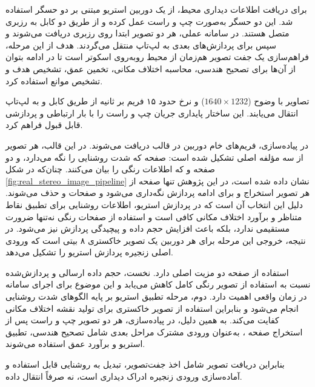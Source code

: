 برای دریافت اطلاعات دیداری محیط، از یک دوربین استریو مبتنی بر دو حسگر  استفاده شد. این دو حسگر به‌صورت چپ و راست عمل کرده و از طریق دو کابل  به رزبری متصل هستند. در سامانه عملی، هر دو تصویر ابتدا روی رزبری دریافت می‌شوند و سپس برای پردازش‌های بعدی به لپ‌تاپ منتقل می‌گردند. هدف از این مرحله، فراهم‌سازی یک جفت تصویر هم‌زمان از محیط روبه‌روی اسکوتر است تا در ادامه بتوان از آن‌ها برای تصحیح هندسی، محاسبه اختلاف مکانی، تخمین عمق، تشخیص هدف و تشخیص موانع استفاده کرد.

تصاویر با وضوح ($1640 \times 1232$) و نرخ حدود ۱۵ فریم بر ثانیه از طریق کابل  و  به لپ‌تاپ انتقال می‌یابند. این ساختار پایداری جریان چپ و راست را با بار ارتباطی و پردازشی قابل قبول فراهم کرد.

در پیاده‌سازی، فریم‌های خام دوربین در قالب  دریافت می‌شوند. در این قالب، هر تصویر از سه مؤلفه اصلی تشکیل شده است: صفحه  که شدت روشنایی را نگه می‌دارد، و دو صفحه  و  که اطلاعات رنگی را بیان می‌کنند. چنان‌که در شکل \ref{fig:real_stereo_image_pipeline} نشان داده شده است، در این پژوهش تنها صفحه  از هر تصویر استخراج و برای ادامه پردازش نگه‌داری می‌شود و صفحات  و  حذف می‌شوند. دلیل این انتخاب آن است که در پردازش استریو، اطلاعات روشنایی برای تطبیق نقاط متناظر و برآورد اختلاف مکانی کافی است و استفاده از صفحات رنگی نه‌تنها ضرورت مستقیمی ندارد، بلکه باعث افزایش حجم داده و پیچیدگی پردازش نیز می‌شود. در نتیجه، خروجی این مرحله برای هر دوربین یک تصویر خاکستری ۸ بیتی است که ورودی اصلی زنجیره پردازش استریو را تشکیل می‌دهد.

استفاده از صفحه  دو مزیت اصلی دارد. نخست، حجم داده ارسالی و پردازش‌شده نسبت به استفاده از تصویر رنگی کامل کاهش می‌یابد و این موضوع برای اجرای سامانه در زمان واقعی اهمیت دارد. دوم، مرحله تطبیق استریو بر پایه الگوهای شدت روشنایی انجام می‌شود و بنابراین استفاده از تصویر خاکستری برای تولید نقشه اختلاف مکانی کفایت می‌کند. به همین دلیل، در پیاده‌سازی، هر دو تصویر چپ و راست پس از استخراج صفحه ، به‌عنوان ورودی مشترک مراحل بعدی شامل تصحیح هندسی، تطبیق استریو و برآورد عمق استفاده می‌شوند.

بنابراین دریافت تصویر شامل اخذ جفت‌تصویر، تبدیل  به روشنایی قابل استفاده و آماده‌سازی ورودی زنجیره ادراک دیداری است، نه صرفاً انتقال داده.

\begin{figure}[htbp]

\end{figure}

